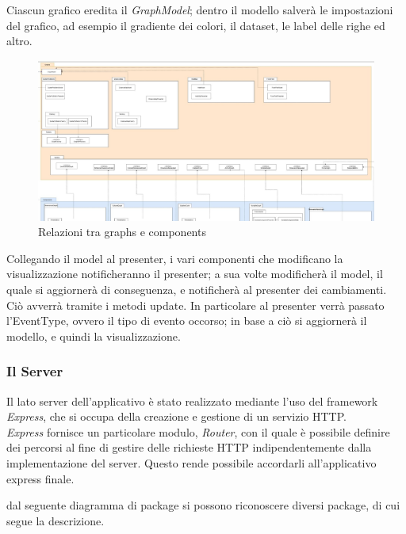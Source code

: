 \documentclass[../manuale_sviluppatore.tex]{subfiles}
\begin{document}
Ciascun grafico eredita il \emph{GraphModel}; dentro il modello salverà le impostazioni del grafico, ad esempio il gradiente dei colori, il dataset, le label delle righe ed altro.

\begin{figure}[H]
	\centering
	\includegraphics[width=18cm]{src/img/graphs-e-components.jpg}
	\caption{Relazioni tra graphs e components}
\end{figure}


Collegando il model al presenter, i vari componenti che modificano la visualizzazione notificheranno il presenter; a sua volte modificherà il model, il quale si aggiornerà di conseguenza, 
e notificherà al presenter dei cambiamenti.
Ciò avverrà tramite i metodi update. In particolare al presenter verrà passato l'EventType, ovvero il tipo di evento occorso; in base a ciò si aggiornerà il modello, e quindi la visualizzazione.

\subsubsection{Il Server}

Il lato server dell'applicativo è stato realizzato mediante l'uso del framework \emph{Express}, che si occupa della creazione e gestione di un servizio HTTP. \\
\emph{Express} fornisce un particolare modulo, \emph{Router}, con il quale è possibile definire dei percorsi 
al fine di gestire delle richieste HTTP indipendentemente dalla implementazione del server. Questo rende possibile
accordarli all'applicativo express finale.

\par dal seguente diagramma di package si possono riconoscere diversi package, di cui segue la descrizione.\\
\end{document}
